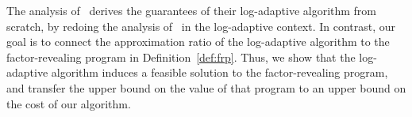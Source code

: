 The analysis of~\cite{MR4928455-Cohen25} derives the guarantees of their log-adaptive algorithm from scratch, by redoing the analysis of~\cite{JMS02,JainMMSV03} in the log-adaptive context.
In contrast, our goal is to connect the approximation ratio of the log-adaptive algorithm to the factor-revealing program in Definition~\ref{def:frp}.
Thus, we show that the log-adaptive algorithm induces a feasible solution to the factor-revealing program, and transfer the upper bound on the value of that program to an upper bound on the cost of our algorithm.

